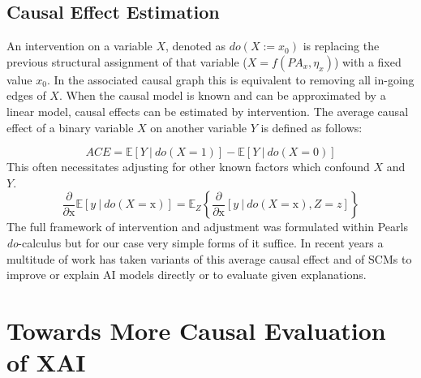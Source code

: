 
\subsection{Causal Effect Estimation}
An intervention on a variable $X$, denoted as $do(X := x_0)$ is replacing the previous structural assignment of that variable ($X = f(PA_x, \eta_x)$) with a fixed value $x_0$. 
In the associated causal graph this is equivalent to removing all in-going edges of $X$.
When the causal model is known and can be approximated by a linear model, causal effects can be estimated by intervention. The average causal effect of a binary variable $X$ on another variable $Y$ is defined as follows:

\begin{equation}
\displaystyle ACE = \mathbb{E} [ Y \ | \ do(X=1) ] - \mathbb{E} [ Y \ | \ do(X=0) ] 
\end{equation}
This often necessitates adjusting for other known factors which confound $X$ and $Y$.
\begin{equation}
\frac{\partial}{\partial \mathrm{x}} \mathbb{E} [ y \ | \ do(X=\mathrm{x}) ] = 
\mathbb{E}_Z \left\{ \frac{\partial}{\partial \mathrm{x}} [ y \ | \ do(X=\mathrm{x}), Z=z ] \right\}
\end{equation}
The full framework of intervention and adjustment was formulated within Pearls \textit{do}-calculus \cite{Pearl2009} but for our case very simple forms of it suffice.
In recent years a multitude of work has taken variants of this average causal effect and of SCMs to improve or explain AI models directly or to evaluate given explanations. 

\section{Towards More Causal Evaluation of XAI}\label{section:causal_xai}

